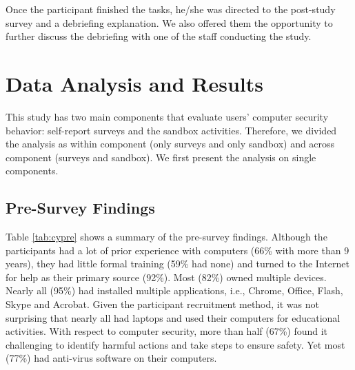 Once the participant finished the tasks, he/she was directed to the post-study survey and a
debriefing explanation. We also offered them the opportunity to further discuss the debriefing with one of the staff conducting the study.


\section{Data Analysis and Results}
This study has two main components that evaluate users' computer security behavior: self-report surveys and the sandbox activities. Therefore, we divided the analysis as within component (only surveys and only sandbox) and across component (surveys and sandbox). We first present the analysis on single components.

\subsection{Pre-Survey Findings}
Table \ref{tab:cypre} shows a summary of the pre-survey findings. Although the participants had a lot of prior experience with computers (66\% with more than 9 years), they had little formal training (59\% had none) and turned to the Internet for help as their primary source (92\%). Most (82\%) owned multiple devices. Nearly all (95\%) had installed multiple applications, i.e., Chrome, Office, Flash, Skype and Acrobat. Given the participant recruitment method, it was not surprising that nearly all had laptops and used their computers for educational activities. With respect to computer security, more than half (67\%) found it challenging to identify harmful actions and take steps to ensure safety. Yet most (77\%) had anti-virus software on their computers.


